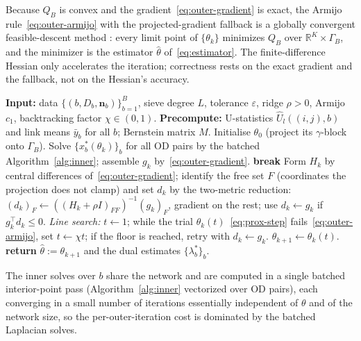 \documentclass[12pt]{article}
\begin{document}
Because $Q_B$ is convex and the gradient~\eqref{eq:outer-gradient} is exact, the
Armijo rule~\eqref{eq:outer-armijo} with the projected-gradient fallback is a
globally convergent feasible-descent method \citep{nocedal2006numerical}: every
limit point of $\{\theta_k\}$ minimizes $Q_B$ over $\mathbb{R}^K \times \Gamma_B$,
and the minimizer is the estimator $\hat\theta$ of~\eqref{eq:estimator}. The
finite-difference Hessian only accelerates the iteration; correctness rests on the
exact gradient and the fallback, not on the Hessian's accuracy.

\begin{algorithm}[ht]
\caption{Projected damped Newton with batched interior-point inner solves.}\label{alg:outer}
\begin{algorithmic}[1]
\State \textbf{Input:} data $\{(b, D_b, \mathbf{n}_b)\}_{b=1}^B$, sieve degree $L$, tolerance $\varepsilon$, ridge $\rho>0$, Armijo $c_1$, backtracking factor $\chi\in(0,1)$.
\State \textbf{Precompute:} U-statistics $\hat U_l((i,j),b)$ and link means $\bar{y}_b$ for all $b$; Bernstein matrix $M$.
\State Initialise $\theta_0$ (project its $\gamma$-block onto $\Gamma_B$).
    \State Solve $\{x^*_b(\theta_k)\}_b$ for all OD pairs by the batched Algorithm~\ref{alg:inner}; assemble $g_k$ by~\eqref{eq:outer-gradient}.
     \textbf{break} \EndIf
    \State Form $H_k$ by central differences of~\eqref{eq:outer-gradient}; identify the free set $F$ (coordinates the projection does not clamp) and set $d_k$ by the two-metric reduction: $(d_k)_F \gets ((H_k+\rho I)_{FF})^{-1} (g_k)_F$, gradient on the rest; use $d_k \gets g_k$ if $g_k^\top d_k \le 0$.
    \State \emph{Line search:} $t \gets 1$; while the trial $\theta_k(t)$~\eqref{eq:prox-step} fails~\eqref{eq:outer-armijo}, set $t \gets \chi t$; if the floor is reached, retry with $d_k \gets g_k$.
    \State $\theta_{k+1} \gets \theta_k(t)$.
\EndFor
\State \textbf{return} $\hat\theta := \theta_{k+1}$ and the dual estimates $\{\lambda^*_b\}_b$.
\end{algorithmic}
\end{algorithm}

The inner solves over $b$ share the network and are computed in a single batched
interior-point pass (Algorithm~\ref{alg:inner} vectorized over OD pairs), each
converging in a small number of iterations essentially independent of $\theta$ and
of the network size, so the per-outer-iteration cost is dominated by the batched
Laplacian solves.
\end{document}
